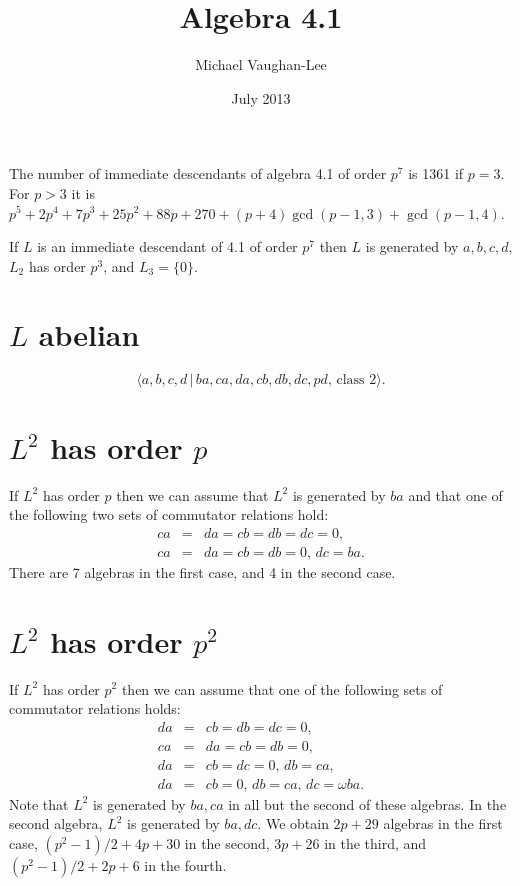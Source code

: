 \documentclass[10pt]{article}
\begin{document}
\title{Algebra 4.1}
\author{Michael Vaughan-Lee}
\date{July 2013}
\maketitle

The number of immediate descendants of algebra 4.1 of order $p^{7}$ is 1361
if $p=3$. For $p>3$ it is $p^{5}+2p^{4}+7p^{3}+25p^{2}+88p+270+(p+4)\gcd
(p-1,3)+\gcd (p-1,4)$.

If $L$ is an immediate descendant of 4.1 of order $p^7$ then $L$ is
generated by $a,b,c,d$, $L_2$ has order $p^3$, and $L_3=\{0\}$.

\section{$L$ abelian}

\[
\langle a,b,c,d\,|\,ba,ca,da,cb,db,dc,pd,\,\text{class }2\rangle . 
\]

\section{$L^{2}$ has order $p$}

If $L^{2}$ has order $p$ then we can assume that $L^{2}$ is generated by $ba$
and that one of the following two sets of commutator relations hold: 
\begin{eqnarray*}
ca &=&da=cb=db=dc=0, \\
ca &=&da=cb=db=0,\,dc=ba.
\end{eqnarray*}%
There are 7 algebras in the first case, and 4 in the second case.

\section{$L^{2}$ has order $p^{2}$}

If $L^{2}$ has order $p^{2}$ then we can assume that one of the following
sets of commutator relations holds: 
\begin{eqnarray*}
da &=&cb=db=dc=0, \\
ca &=&da=cb=db=0, \\
da &=&cb=dc=0,\,db=ca, \\
da &=&cb=0,\,db=ca,\,dc=\omega ba.
\end{eqnarray*}%
Note that $L^{2}$ is generated by $ba,ca$ in all but the second of these
algebras. In the second algebra, $L^{2}$ is generated by $ba,dc$. We obtain $%
2p+29$ algebras in the first case, $(p^{2}-1)/2+4p+30$ in the second, $3p+26$
in the third, and $(p^{2}-1)/2+2p+6$ in the fourth.
\end{document}
